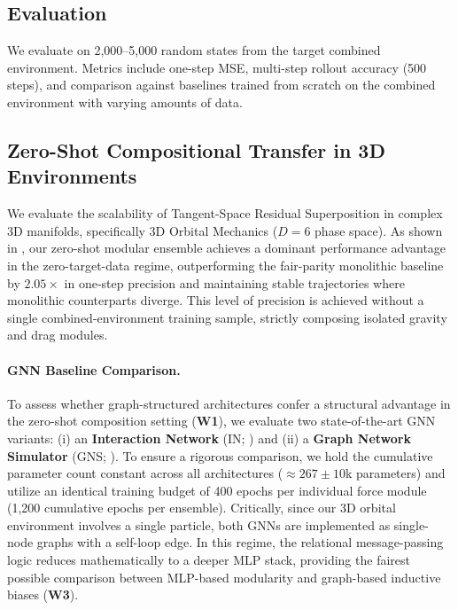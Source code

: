 \documentclass[twoside,11pt]{article}
\begin{document}
\subsection{Evaluation}

We evaluate on 2{,}000--5{,}000 random states from the target combined environment. Metrics include one-step MSE, multi-step rollout accuracy (500 steps), and comparison against baselines trained from scratch on the combined environment with varying amounts of data.

\subsection{Zero-Shot Compositional Transfer in 3D Environments}

We evaluate the scalability of Tangent-Space Residual Superposition in complex 3D manifolds, specifically 3D Orbital Mechanics ($D=6$ phase space). As shown in , our zero-shot modular ensemble achieves a dominant performance advantage in the zero-target-data regime, outperforming the fair-parity monolithic baseline by $2.05\times$ in one-step precision and maintaining stable trajectories where monolithic counterparts diverge. This level of precision is achieved without a single combined-environment training sample, strictly composing isolated gravity and drag modules.

\paragraph{GNN Baseline Comparison.}
To assess whether graph-structured architectures confer a structural advantage in the zero-shot composition setting (\textbf{W1}), we evaluate two state-of-the-art GNN variants: (i) an \textbf{Interaction Network} (IN; \citealt{battaglia2016interaction}) and (ii) a \textbf{Graph Network Simulator} (GNS; \citealt{sanchez2020learning}). To ensure a rigorous comparison, we hold the cumulative parameter count constant across all architectures ($\approx 267\pm10$k parameters) and utilize an identical training budget of 400 epochs per individual force module (1,200 cumulative epochs per ensemble). Critically, since our 3D orbital environment involves a single particle, both GNNs are implemented as single-node graphs with a self-loop edge. In this regime, the relational message-passing logic reduces mathematically to a deeper MLP stack, providing the fairest possible comparison between MLP-based modularity and graph-based inductive biases (\textbf{W3}).
\end{document}
